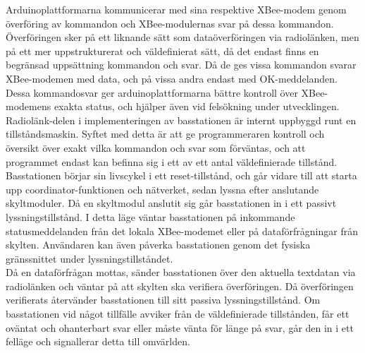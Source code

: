 \documentclass[a4paper,11pt]{article}
\begin{document}
Arduinoplattformarna kommunicerar med sina respektive XBee-modem genom överföring av kommandon och XBee-modulernas svar på dessa kommandon. Överföringen sker på ett liknande sätt som dataöverföringen via radiolänken, men på ett mer uppstrukturerat och väldefinierat sätt, då det endast finns en begränsad uppsättning kommandon och svar. Då de ges vissa kommandon svarar XBee-modemen med data, och på vissa andra endast med OK-meddelanden. Dessa kommandosvar ger arduinoplattformarna bättre kontroll över XBee-modemens exakta status, och hjälper även vid felsökning under utvecklingen. \\

Radiolänk-delen i implementeringen av basstationen är internt uppbyggd runt en tillståndsmaskin. Syftet med detta är att ge programmeraren kontroll och översikt över exakt vilka kommandon och svar som förväntas, och att programmet endast kan befinna sig i ett av ett antal väldefinierade tillstånd. Basstationen börjar sin livscykel i ett reset-tillstånd, och går vidare till att starta upp coordinator-funktionen och nätverket, sedan lyssna efter anslutande skyltmoduler. Då en skyltmodul anslutit sig går basstationen in i ett passivt lyssningstillstånd. I detta läge väntar basstationen på inkommande statusmeddelanden från det lokala XBee-modemet eller på dataförfrågningar från skylten. Användaren kan även påverka basstationen genom det fysiska gränssnittet under lyssningstillståndet. \\

Då en dataförfrågan mottas, sänder basstationen över den aktuella textdatan via radiolänken och väntar på att skylten ska verifiera överföringen. Då överföringen verifierats återvänder basstationen till sitt passiva lyssningstillstånd. Om basstationen vid något tillfälle avviker från de väldefinierade tillstånden, får ett oväntat och ohanterbart svar eller måste vänta för länge på svar, går den in i ett felläge och signallerar detta till omvärlden. \\
\end{document}
